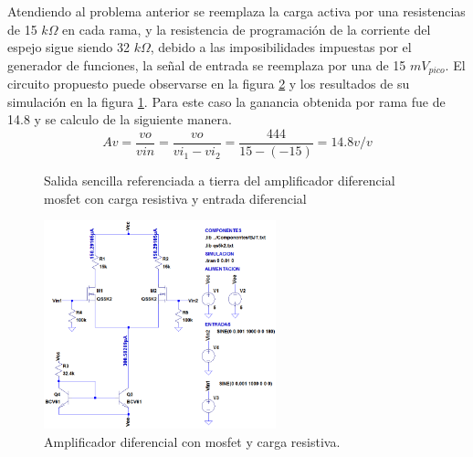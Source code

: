Atendiendo al problema anterior se reemplaza la carga activa por una resistencias de 15 $k\Omega$ en cada rama, y la resistencia de programación de la corriente del espejo sigue siendo 32 $k\Omega$, debido a las imposibilidades impuestas por el generador de funciones, la señal de entrada se reemplaza por una de 15 $mV_{pico}$. El circuito propuesto puede observarse en la figura \ref{ampdifmosfetressim} y los resultados de su simulación en la figura \ref{sim-mosfet-indif-sinout}. Para este caso la ganancia obtenida por rama fue de 14.8 y se calculo de la siguiente manera. \\

\begin{equation}
Av=\frac{vo}{vin}=\frac{vo}{vi_1-vi_2}=\frac{444}{15-(-15)}=14.8 v/v
\end{equation}

\begin{figure}[H]

\centering


\caption{Salida sencilla referenciada a tierra del amplificador diferencial mosfet con carga resistiva y entrada diferencial}
\label{sim-mosfet-indif-sinout}

\end{figure}
\begin{figure}[H]
  \centering
  \includegraphics[width=0.6\textwidth]{Capitulo_2/ampdifmosfetres.png}
  \caption{Amplificador diferencial con mosfet y carga resistiva.}
  \label{ampdifmosfetressim}
\end{figure}

